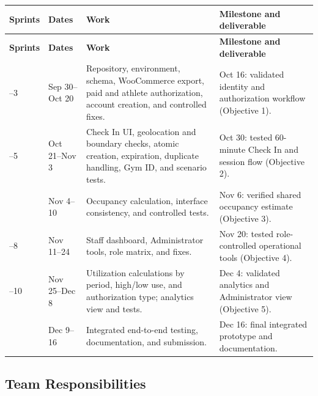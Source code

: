 \documentclass[11pt,letterpaper]{article}
\begin{document}
\begin{center}
\small
\begin{longtable}{L{1.4cm} L{2.3cm} L{5.4cm} L{4.5cm}}
\toprule
\textbf{Sprints} & \textbf{Dates} & \textbf{Work} & \textbf{Milestone and deliverable} \\
\midrule
\endfirsthead
\toprule
\textbf{Sprints} & \textbf{Dates} & \textbf{Work} & \textbf{Milestone and deliverable} \\
\midrule
\endhead
\bottomrule
{}--3 & Sep 30--Oct 20 & Repository, environment, schema, WooCommerce export, paid and athlete authorization, account creation, and controlled fixes. & Oct 16: validated identity and authorization workflow (Objective 1). \\
--5 & Oct 21--Nov 3 & Check In UI, geolocation and boundary checks, atomic creation, expiration, duplicate handling, Gym ID, and scenario tests. & Oct 30: tested 60-minute Check In and session flow (Objective 2). \\
 & Nov 4--10 & Occupancy calculation, interface consistency, and controlled tests. & Nov 6: verified shared occupancy estimate (Objective 3). \\
--8 & Nov 11--24 & Staff dashboard, Administrator tools, role matrix, and fixes. & Nov 20: tested role-controlled operational tools (Objective 4). \\
--10 & Nov 25--Dec 8 & Utilization calculations by period, high/low use, and authorization type; analytics view and tests. & Dec 4: validated analytics and Administrator view (Objective 5). \\
 & Dec 9--16 & Integrated end-to-end testing, documentation, and submission. & Dec 16: final integrated prototype and documentation. \\
\end{longtable}
\end{center}

\subsection{Team Responsibilities}
\end{document}
